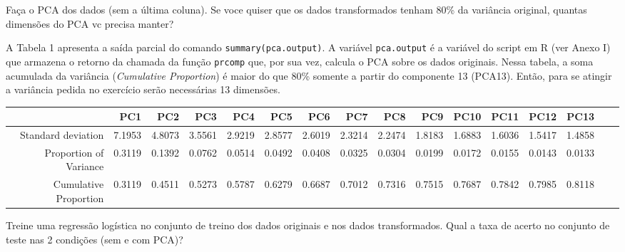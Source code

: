 \documentclass[10pt, a4paper]{exam}
\begin{document}
	\begin{questions}	    
	    \question
	    Faça o PCA dos dados (sem a última coluna). Se voce quiser que os dados transformados tenham 80\% da variância original, quantas dimensões do PCA vc precisa manter?
	    \begin{solution}
	    	
			A Tabela 1 apresenta a saída parcial do comando \verb|summary(pca.output)|. A variável \verb|pca.output| é a variável do script em R (ver Anexo I) que armazena o retorno da chamada da função \verb|prcomp| que, por sua vez, calcula o PCA sobre os dados originais. 
			Nessa tabela, a soma acumulada da variância (\textit{Cumulative Proportion}) é maior do que 80\% somente a partir do componente 13 (PCA13). Então, para se atingir a variância pedida no exercício serão necessárias 13 dimensões.
			
			\begin{center}
				\setlength{\tabcolsep}{1.8pt}
				\renewcommand{\arraystretch}{2}
				\scriptsize
				\begin{tabular}{rrrrrrrrrrrrrrrr}
				  \hline
				 & PC1 & PC2 & PC3 & PC4 & PC5 & PC6 & PC7 & PC8 & PC9 & PC10 & PC11 & PC12 & PC13 \\ 
				  \hline
				Standard deviation & 7.1953 & 4.8073 & 3.5561 & 2.9219 & 2.8577 & 2.6019 & 2.3214 & 2.2474 & 1.8183 & 1.6883 & 1.6036 & 1.5417 & 1.4858 \\ 
				  Proportion of Variance & 0.3119 & 0.1392 & 0.0762 & 0.0514 & 0.0492 & 0.0408 & 0.0325 & 0.0304 & 0.0199 & 0.0172 & 0.0155 & 0.0143 & 0.0133 \\ 
				  Cumulative Proportion & 0.3119 & 0.4511 & 0.5273 & 0.5787 & 0.6279 & 0.6687 & 0.7012 & 0.7316 & 0.7515 & 0.7687 & 0.7842 & 0.7985 & 0.8118 \\ 
				   \hline
				\end{tabular}
			\end{center}
		\end{solution}
	    
	    \question
	    Treine uma regressão logística no conjunto de treino dos dados originais e nos dados transformados. Qual a taxa de acerto no conjunto de teste nas 2 condições (sem e com PCA)? 
	     \begin{solution}
	    	

\end{solution}
\end{questions}
\end{document}
